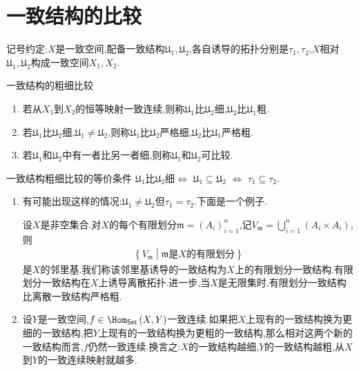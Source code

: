\section{一致结构的比较}

记号约定:$X$是一致空间,配备一致结构$\mathfrak{U}_{1},\mathfrak{U}_{2}$,各自诱导的拓扑分别是$\tau_{1},\tau_{2}$,$X$相对$\mathfrak{U}_{1},\mathfrak{U}_{2}$构成一致空间$X_{1},X_{2}$.

\begin{definition}{一致结构的粗细比较}{}
	\begin{enumerate}
		\item 若从$X_{1}$到$X_{2}$的恒等映射一致连续,则称$\mathfrak{U}_{1}$比$\mathfrak{U}_{2}$细,$\mathfrak{U}_{2}$比$\mathfrak{U}_{1}$粗.
		\item 若$\mathfrak{U}_{1}$比$\mathfrak{U}_{2}$细,$\mathfrak{U}_{1}\neq\mathfrak{U}_{2}$,则称$\mathfrak{U}_{1}$比$\mathfrak{U}_{2}$严格细,$\mathfrak{U}_{2}$比$\mathfrak{U}_{1}$严格粗.
		\item 若$\mathfrak{U}_{1}$和$\mathfrak{U}_{2}$中有一者比另一者细,则称$\mathfrak{U}_{1}$和$\mathfrak{U}_{2}$可比较.
	\end{enumerate}
\end{definition}

\begin{proposition}{一致结构粗细比较的等价条件}{}
	$\mathfrak{U}_{1}$比$\mathfrak{U}_{2}$细$\iff$ $\mathfrak{U}_{1}\subseteq\mathfrak{U}_{2}$ $\iff$ $\tau_{1}\subseteq\tau_{2}$.
\end{proposition}

\begin{remark}{}{}
	\begin{enumerate}
		\item 有可能出现这样的情况:$\mathfrak{U}_{1}\neq\mathfrak{U}_{2}$但$\tau_{1}=\tau_{2}$.下面是一个例子.
		
		设$X$是非空集合.对$X$的每个有限划分$\mathfrak{m}=\left(A_{i}\right)_{i=1}^{n}$,记$V_{\mathfrak{m}}=\bigcup\limits_{i=1}^{n}\left(A_{i}\times A_{i}\right)$,则
		\begin{align*}
			\left\{V_{\mathfrak{m}}\middle|\mathfrak{m}\text{是}X\text{的有限划分}\right\}
		\end{align*}
		是$X$的邻里基.我们称该邻里基诱导的一致结构为$X$上的有限划分一致结构.有限划分一致结构在$X$上诱导离散拓扑.进一步,当$X$是无限集时,有限划分一致结构比离散一致结构严格粗.
		\item 设$Y$是一致空间,$f\in\Hom_{\mathsf{Set}}\left(X,Y\right)$一致连续.如果把$X$上现有的一致结构换为更细的一致结构,把$Y$上现有的一致结构换为更粗的一致结构,那么相对这两个新的一致结构而言,$f$仍然一致连续.换言之:$X$的一致结构越细,$Y$的一致结构越粗,从$X$到$Y$的一致连续映射就越多.
	\end{enumerate}
\end{remark}